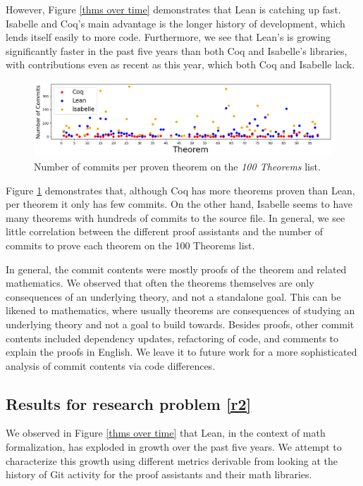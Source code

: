 \documentclass[sigconf,nonacm]{acmart}
\begin{document}
However, Figure \ref{thms over time} demonstrates that Lean is catching up fast. Isabelle and Coq's main advantage is the longer history of development, which lends itself easily to more code. Furthermore, we see that Lean's \mathlib is growing significantly faster in the past five years than both Coq and Isabelle's libraries, with contributions even as recent as this year, which both Coq and Isabelle lack.

\begin{figure}[H]
  \includegraphics[scale=0.25]{test.png}
  \caption{Number of commits per proven theorem on the \textit{100 Theorems} list.}
  \label{number of commits}
\end{figure}

Figure \ref{number of commits} demonstrates that, although Coq has more theorems proven than Lean, per theorem it only has few commits. On the other hand, Isabelle seems to have many theorems with hundreds of commits to the source file. In general, we see little correlation between the different proof assistants and the number of commits to prove each theorem on the 100 Theorems list. 

In general, the commit contents were mostly proofs of the theorem and related mathematics. We observed that often the theorems themselves are only consequences of an underlying theory, and not a standalone goal. This can be likened to mathematics, where usually theorems are consequences of studying an underlying theory and not a goal to build towards. Besides proofs, other commit contents included dependency updates, refactoring of code, and comments to explain the proofs in English. We leave it to future work for a more sophisticated analysis of commit contents via code differences.

\subsection{Results for research problem \ref{r2}}

We observed in Figure \ref{thms over time} that Lean, in the context of math formalization, has exploded in growth over the past five years. We attempt to characterize this growth using different metrics derivable from looking at the history of Git activity for the proof assistants and their math libraries.
\end{document}
